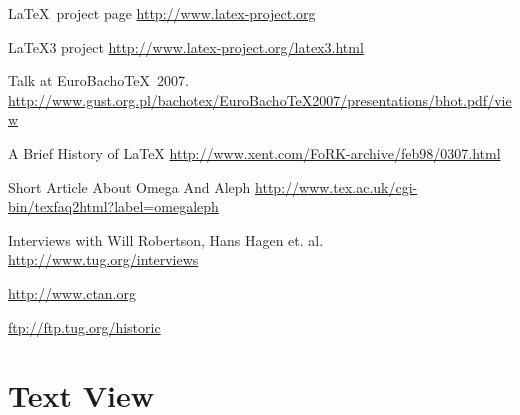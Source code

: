 \documentclass{scrartcl}
\begin{document}
\begin{thebibliography}{10}
{\LaTeX\ project page}
\newblock \url{http://www.latex-project.org}

{\LaTeX3 project}
\newblock \url{http://www.latex-project.org/latex3.html}

\vspace{2ex}
\vspace{1ex}
\newblock Talk at EuroBacho\TeX\ 2007.\\
\newblock \url{http://www.gust.org.pl/bachotex/EuroBachoTeX2007/presentations/bhot.pdf/view}

{A Brief History of \LaTeX}
\newblock \url{http://www.xent.com/FoRK-archive/feb98/0307.html}

{Short Article About Omega And Aleph}
\newblock \url{http://www.tex.ac.uk/cgi-bin/texfaq2html?label=omegaleph}

{Interviews with Will Robertson, Hans Hagen et. al.}
\newblock \url{http://www.tug.org/interviews}

\vspace{2ex}
\vspace{1ex}

\newblock \url{http://www.ctan.org}

\newblock \url{ftp://ftp.tug.org/historic}
\end{thebibliography}

\clearpage
\section{Text View}
\label{sec:text}
\end{document}
